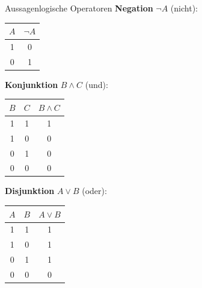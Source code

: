 \documentclass[a4paper, fontsize=7pt]{scrartcl}
\begin{document}
\begin{mainbox}{Aussagenlogische Operatoren}
\textbf{Negation} $\neg A$ (nicht):
\begin{center}
\begin{tabular}{c|c}
$A$ & $\neg A$ \\
\hline
1 & 0 \\
0 & 1
\end{tabular}
\end{center}

\textbf{Konjunktion} $B \land C$ (und):
\begin{center}
\begin{tabular}{cc|c}
$B$ & $C$ & $B \land C$ \\
\hline
1 & 1 & 1 \\
1 & 0 & 0 \\
0 & 1 & 0 \\
0 & 0 & 0
\end{tabular}
\end{center}

\textbf{Disjunktion} $A \lor B$ (oder):
\begin{center}
\begin{tabular}{cc|c}
$A$ & $B$ & $A \lor B$ \\
\hline
1 & 1 & 1 \\
1 & 0 & 1 \\
0 & 1 & 1 \\
0 & 0 & 0
\end{tabular}
\end{center}
\end{mainbox}
\end{document}
